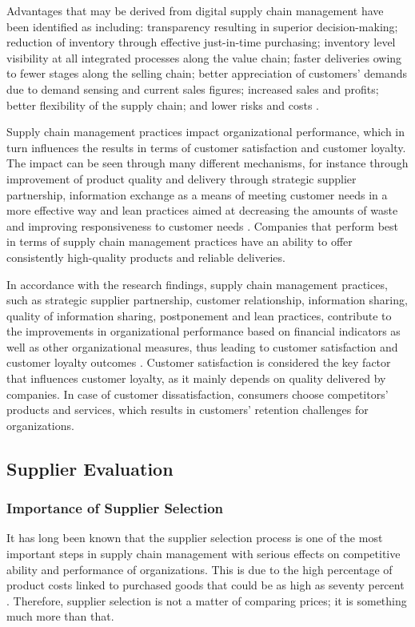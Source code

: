 \documentclass[11pt]{article}
\begin{document}
Advantages that may be derived from digital supply chain management have been identified as including: transparency resulting in superior decision-making; reduction of inventory through effective just-in-time purchasing; inventory level visibility at all integrated processes along the value chain; faster deliveries owing to fewer stages along the selling chain; better appreciation of customers' demands due to demand sensing and current sales figures; increased sales and profits; better flexibility of the supply chain; and lower risks and costs \cite{ref21}.

Supply chain management practices impact organizational performance, which in turn influences the results in terms of customer satisfaction and customer loyalty. The impact can be seen through many different mechanisms, for instance through improvement of product quality and delivery through strategic supplier partnership, information exchange as a means of meeting customer needs in a more effective way and lean practices aimed at decreasing the amounts of waste and improving responsiveness to customer needs \cite{ref22}. Companies that perform best in terms of supply chain management practices have an ability to offer consistently high-quality products and reliable deliveries.

In accordance with the research findings, supply chain management practices, such as strategic supplier partnership, customer relationship, information sharing, quality of information sharing, postponement and lean practices, contribute to the improvements in organizational performance based on financial indicators as well as other organizational measures, thus leading to customer satisfaction and customer loyalty outcomes \cite{ref22}. Customer satisfaction is considered the key factor that influences customer loyalty, as it mainly depends on quality delivered by companies. In case of customer dissatisfaction, consumers choose competitors' products and services, which results in customers' retention challenges for organizations.

\subsection{Supplier Evaluation}

\subsubsection{Importance of Supplier Selection}

It has long been known that the supplier selection process is one of the most important steps in supply chain management with serious effects on competitive ability and performance of organizations. This is due to the high percentage of product costs linked to purchased goods that could be as high as seventy percent \cite{ref23}. Therefore, supplier selection is not a matter of comparing prices; it is something much more than that.
\end{document}
